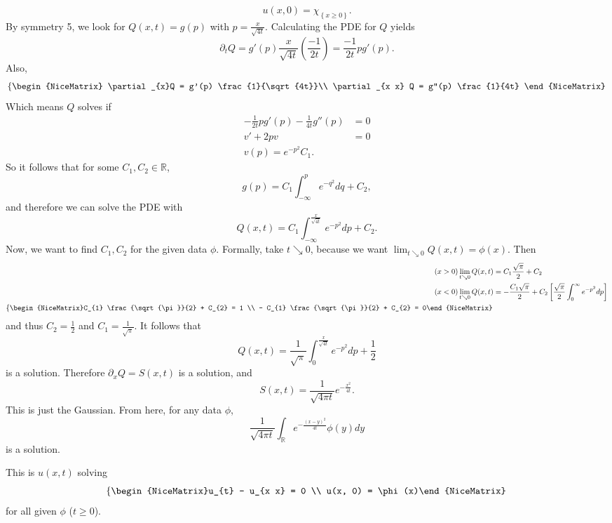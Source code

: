 \[ u(x, 0) = \chi_{\left\{ x \ge 0 \right\}}. \]
By symmetry 5, we look for \( Q(x, t) = g(p) \) with \( p = \frac{x}{\sqrt{4t}} \). Calculating the PDE for \( Q \) yields
\[ \partial_{t} Q = g'(p) \frac{x}{\sqrt{4t}} \left( \frac{-1}{2t} \right) = \frac{-1}{2t} p g'(p). \]
Also, 
\[ \left\{\begin{NiceMatrix}
	\partial_{x}Q = g'(p) \frac{1}{\sqrt{4t}}\\
	\partial_{x x} Q = g''(p) \frac{1}{4t}
\end{NiceMatrix}\right. \]
Which means \( Q \) solves if
\begin{align*}
	- \frac{1}{2t} p g'(p) - \frac{1}{4t} g''(p) &= 0 \\
	\tag{\( v = g' \)}v' + 2pv &= 0 \\
	v(p) = e^{- p^{2}}C_{1}.
\end{align*}
So it follows that for some \( C_{1}, C_{2} \in \mathbb{R} \),
\[ g(p) = C_{1} \int_{- \infty}^{p} e^{-q^{2}} dq + C_{2}, \]
and therefore we can solve the PDE with
\[ Q(x, t) = C_{1} \int_{- \infty}^{\frac{x}{\sqrt{4t}}} e^{-p^{2}} dp + C_{2}. \]
Now, we want to find \( C_{1}, C_{2} \) for the given data \( \phi \). Formally, take \( t \searrow 0 \), because we want \( \lim_{t \searrow 0} Q(x, t) = \phi(x) \). Then
\begin{align*}
	\tag{\( x > 0 \)} \lim_{t \searrow 0} Q(x, t) &= C_{1} \frac{\sqrt{\pi}}{2} + C_{2} \\
	\tag{\( x < 0 \)} \lim_{t \searrow 0} Q(x, t) &= - \frac{C_{1} \sqrt{\pi}}{2} + C_{2} \left[ \frac{\sqrt{\pi}}{2} \int_{0}^{\infty} e^{- p^{2}} dp  \right] \\
	\left\{\begin{NiceMatrix}C_{1} \frac{\sqrt{\pi}}{2} + C_{2} = 1 \\ - C_{1} \frac{\sqrt{\pi}}{2} + C_{2} = 0\end{NiceMatrix}\right. 
\end{align*}
and thus \( C_{2} = \frac{1}{2} \) and \( C_{1} = \frac{1}{\sqrt{\pi}} \). It follows that
\[ Q(x, t) = \frac{1}{\sqrt{\pi}} \int_{0}^{\frac{x}{\sqrt{4t}}} e^{-p^{2}} dp + \frac{1}{2} \]
is a solution. Therefore \( \partial_{x}Q = S(x, t) \) is a solution, and
\[ S(x, t) = \frac{1}{\sqrt{4 \pi t}} e^{- \frac{x^{2}}{4t}}. \]
This is just the Gaussian. From here, for any data \( \phi \),
\[ \frac{1}{\sqrt{4 \pi t}} \int_{\mathbb{R}}  e^{- \frac{(x-y)^{2}}{4t}} \phi(y) dy \]
is a solution.
\begin{claim}
	This is \( u(x, t) \) solving
	\[ \left\{\begin{NiceMatrix}u_{t} - u_{x x} = 0 \\ u(x, 0) = \phi(x)\end{NiceMatrix}\right.  \]
	for all given \( \phi \) (\( t \ge 0 \)).
\end{claim}
